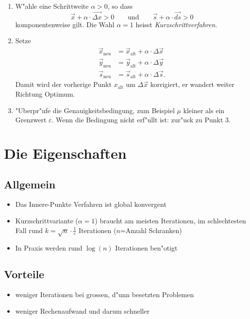 \begin{refsection}
\begin{enumerate}
\item W"ahle eine Schrittweite $\alpha > 0$, so dass
\[
\vec{x}+\alpha \cdot \vec{\Delta x} > 0\qquad\text{und}\qquad
\vec{s}+\alpha \cdot \vec{ds} > 0
\]
komponentenweise gilt. Die Wahl
$\alpha = 1$ heisst {\it Kurzschrittverfahren}.
\item Setze
\begin{align*}
\vec{x}_{\text{neu}}&= \vec{x}_{\text{alt}}+\alpha \cdot \Delta \vec{x}\\
\vec{y}_{\text{neu}}&= \vec{y}_{\text{alt}}+\alpha \cdot \Delta \vec{y}\\
\vec{s}_{\text{neu}}&= \vec{s}_{\text{alt}}+\alpha \cdot \Delta \vec{s}.
\end{align*}
Damit wird der vorherige Punkt $x_{\text{alt}}$ um $\Delta \vec{x}$
korrigiert, er wandert weiter Richtung Optimum.
\item "Uberpr"ufe die Genauigkeitsbedingung, zum Beispiel
$\mu$ kleiner als ein Grenzwert $\varepsilon$.
Wenn die Bedingung nicht erf"ullt ist: zur"uck zu Punkt 3.
\end{enumerate}

\section{Die Eigenschaften}
\subsection{Allgemein}
\begin{itemize}
	\item Das Innere-Punkte Verfahren ist global konvergent
	\item {Kurzschrittvariante ($\alpha = 1$) braucht am meisten Iterationen, im schlechtesten Fall rund $k=\sqrt{n} \cdot \frac{1}{\epsilon}$ Iterationen ($n$=Anzahl Schranken)}
	\item In Praxis werden rund $\log(n)$ Iterationen ben"otigt
\end{itemize}

\subsection{Vorteile}
\begin{itemize}
	\item weniger Iterationen bei grossen, d"unn besetzten Problemen
	\item weniger Rechenaufwand und darum schneller
\end{itemize}


\end{refsection}
